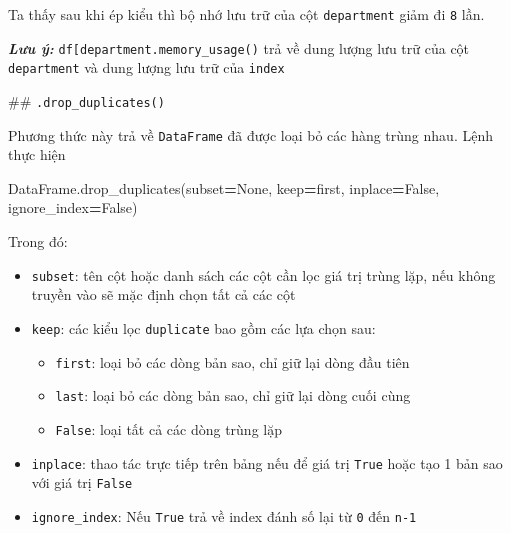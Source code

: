 \documentclass[
]{book}
\makeatletter
\newenvironment{Shaded}{\begin{snugshade}}{\end{snugshade}}
\newcommand{\NormalTok}[1]{#1}
\newcommand{\OperatorTok}[1]{\textcolor[rgb]{0.81,0.36,0.00}{\textbf{#1}}}
\newcommand{\StringTok}[1]{\textcolor[rgb]{0.31,0.60,0.02}{#1}}
\newcommand{\VariableTok}[1]{\textcolor[rgb]{0.00,0.00,0.00}{#1}}
\providecommand{\tightlist}{%
  \setlength{\itemsep}{0pt}\setlength{\parskip}{0pt}}
\newenvironment{kframe}{%
\medskip{}
\setlength{\fboxsep}{.8em}
 \def\at@end@of@kframe{}%
 \ifinner\ifhmode%
  \def\at@end@of@kframe{\end{minipage}}%
  \begin{minipage}{\columnwidth}%
 \fi\fi%
 \def\FrameCommand##1{\hskip\@totalleftmargin \hskip-\fboxsep
 \colorbox{shadecolor}{##1}\hskip-\fboxsep
     \hskip-\linewidth \hskip-\@totalleftmargin \hskip\columnwidth}%
 \MakeFramed {\advance\hsize-\width
   \@totalleftmargin\z@ \linewidth\hsize
   \@setminipage}}%
 {\par\unskip\endMakeFramed%
 \at@end@of@kframe}
\newenvironment{rmdblock}[1]
  {
  \begin{itemize}
  \renewcommand{\labelitemi}{
    \raisebox{-.7\height}[0pt][0pt]{
      {\setkeys{Gin}{width=3em,keepaspectratio}\texttt{[image: images/\#1]}}
    }
  }
  \setlength{\fboxsep}{1em}
  \begin{kframe}
  \item
  }
  {
  \end{kframe}
  \end{itemize}
  }
\newenvironment{rmdnote}
  {\begin{rmdblock}{note}}
  {\end{rmdblock}}
\makeatother
\begin{document}
Ta thấy sau khi ép kiểu thì bộ nhớ lưu trữ của cột \texttt{department} giảm đi \texttt{8} lần.

\begin{rmdnote}
\textbf{\emph{Lưu ý:}}
\texttt{df{[}\textquotesingle{}department\textquotesingle{}{]}.memory\_usage()} trả về dung lượng lưu trữ của cột \texttt{department} và dung lượng lưu trữ của \texttt{index}
\end{rmdnote}
\#\# \texttt{.drop\_duplicates()}

Phương thức này trả về \texttt{DataFrame} đã được loại bỏ các hàng trùng nhau.
Lệnh thực hiện

\begin{Shaded}
\begin{Highlighting}[]
\NormalTok{DataFrame.drop\_duplicates(subset}\OperatorTok{=}\VariableTok{None}\NormalTok{, keep}\OperatorTok{=}\StringTok{\textquotesingle{}first\textquotesingle{}}\NormalTok{, inplace}\OperatorTok{=}\VariableTok{False}\NormalTok{, ignore\_index}\OperatorTok{=}\VariableTok{False}\NormalTok{)}
\end{Highlighting}
\end{Shaded}

Trong đó:

\begin{itemize}
\item
  \texttt{subset}: tên cột hoặc danh sách các cột cần lọc giá trị trùng lặp, nếu không truyền vào sẽ mặc định chọn tất cả các cột
\item
  \texttt{keep}: các kiểu lọc \texttt{duplicate} bao gồm các lựa chọn sau:

  \begin{itemize}
  \tightlist
  \item
    \texttt{\textquotesingle{}first\textquotesingle{}}: loại bỏ các dòng bản sao, chỉ giữ lại dòng đầu tiên
  \item
    \texttt{\textquotesingle{}last\textquotesingle{}}: loại bỏ các dòng bản sao, chỉ giữ lại dòng cuối cùng
  \item
    \texttt{False}: loại tất cả các dòng trùng lặp
  \end{itemize}
\item
  \texttt{inplace}: thao tác trực tiếp trên bảng nếu để giá trị \texttt{True} hoặc tạo 1 bản sao với giá trị \texttt{False}
\item
  \texttt{ignore\_index}: Nếu \texttt{True} trả về index đánh số lại từ \texttt{0} đến \texttt{n-1}
\end{itemize}
\end{document}
